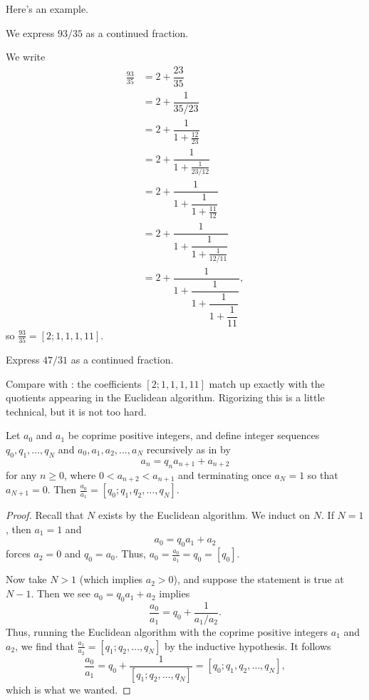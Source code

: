 \documentclass[../notes.tex]{subfiles}
\begin{document}
Here's an example.
\begin{example} \label{ex:cf}
	We express $93/35$ as a continued fraction.
\end{example}
\begin{solution}
	We write
	\begin{align*}
		\frac{93}{35} &= 2+\dfrac{23}{35} \\
		&= 2+\dfrac1{35/23} \\
		&= 2+\dfrac1{1+\frac{12}{23}} \\
		&= 2+\dfrac1{1+\frac1{23/12}} \\
		&= 2+\dfrac1{1+\dfrac1{1+\frac{11}{12}}} \\
		&= 2+\dfrac1{1+\dfrac1{1+\frac1{12/11}}} \\
		&= 2+\dfrac1{1+\dfrac1{1+\dfrac1{1+\dfrac1{11}}}},
	\end{align*}
	so $\frac{93}{35}=[2;1,1,1,11]$.
\end{solution}
\begin{exercise}
	Express $47/31$ as a continued fraction.
\end{exercise}
Compare  with : the coefficients $[2;1,1,1,11]$ match up exactly with the quotients appearing in the Euclidean algorithm. Rigorizing this is a little technical, but it is not too hard.
\begin{proposition} \label{prop:cf-by-ea}
	Let $a_0$ and $a_1$ be coprime positive integers, and define integer sequences $q_0,q_1,\ldots,q_N$ and $a_0,a_1,a_2,\ldots,a_N$ recursively as in  by
	\[a_n=q_na_{n+1}+a_{n+2}\]
	for any $n\ge0$, where $0<a_{n+2}<a_{n+1}$ and terminating once $a_N=1$ so that $a_{N+1}=0$. Then $\frac{a_0}{a_1}=[q_0;q_1,q_2,\ldots,q_N]$.
\end{proposition}
\begin{proof}
	Recall that $N$ exists by the Euclidean algorithm. We induct on $N$. If $N=1$, then $a_1=1$ and
	\[a_0=q_0a_1+a_2\]
	forces $a_2=0$ and $q_0=a_0$. Thus, $a_0=\frac{a_0}{a_1}=q_0=[q_0]$.

	Now take $N>1$ (which implies $a_2>0$), and suppose the statement is true at $N-1$. Then we see $a_0=q_0a_1+a_2$ implies
	\[\frac{a_0}{a_1}=q_0+\frac1{a_1/a_2}.\]
	Thus, running the Euclidean algorithm with the coprime positive integers $a_1$ and $a_2$, we find that $\frac{a_1}{a_2}=[q_1;q_2,\ldots,q_N]$ by the inductive hypothesis. It follows
	\[\frac{a_0}{a_1}=q_0+\frac1{[q_1;q_2,\ldots,q_N]}=[q_0;q_1,q_2,\ldots,q_N],\]
	which is what we wanted.
\end{proof}
\end{document}
